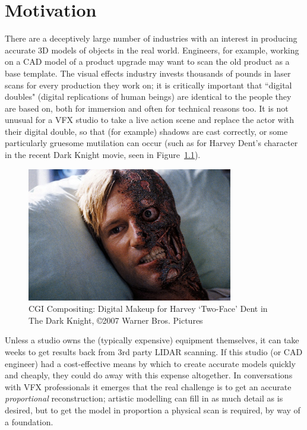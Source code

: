 \documentclass[a4paper,10pt]{report}
\begin{document}
\pagebreak
\setlength{\cftbeforechapskip}{5px}
\tableofcontents
\pagebreak

\begingroup
\renewcommand*{\addvspace}[1]{}
\setlength{\cftbeforefigskip}{5px}
\listoffigures
\endgroup

\newpage
{}

\chapter{Motivation}
There are a deceptively large number of industries with an interest in producing accurate 3D models of objects in the real world. Engineers, for example, working on a CAD model of a product upgrade may want to scan the old product as a base template. The visual effects industry invests thousands of pounds in laser scans for every production they work on; it is critically important that ``digital doubles" (digital replications of human beings) are identical to the people they are based on, both for immersion and often for technical reasons too. It is not unusual for a VFX studio to take a live action scene and replace the actor with their digital double, so that (for example) shadows are cast correctly, or some particularly gruesome mutilation can occur (such as for Harvey Dent's character in the recent Dark Knight movie, seen in Figure~\ref{twoface}).

\begin{figure}[h]
  \begin{center}
    \includegraphics[width=340px]{twoface}
  \end{center}
  \caption[CGI Compositing: Digital Makeup for Harvey `Two-Face' Dent in The Dark Knight]{CGI Compositing: Digital Makeup for Harvey `Two-Face' Dent in The Dark Knight, \protect \copyright 2007 Warner Bros. Pictures}
  \label{twoface}
\end{figure}

Unless a studio owns the (typically expensive) equipment themselves, it can take weeks to get results back from 3rd party LIDAR scanning. If this studio (or CAD engineer) had a cost-effective means by which to create accurate models quickly and cheaply, they could do away with this expense altogether. In conversations with VFX professionals it emerges that the real challenge is to get an accurate \textit{proportional} reconstruction; artistic modelling can fill in as much detail as is desired, but to get the model in proportion a physical scan is required, by way of a foundation.
\end{document}
